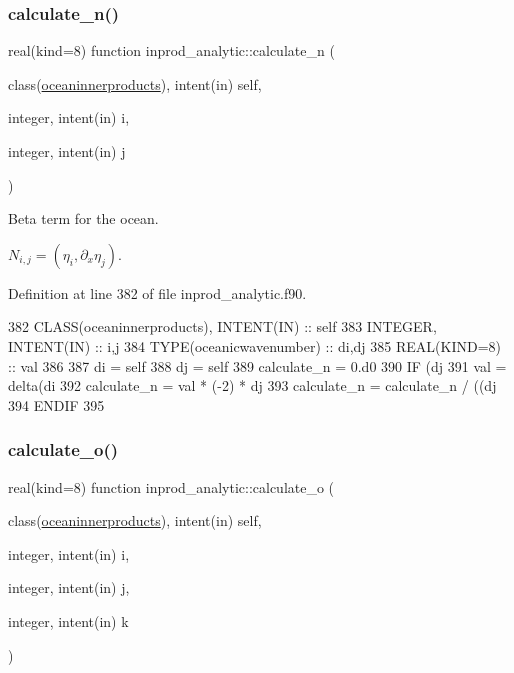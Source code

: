 \subsubsection{\texorpdfstring{calculate\+\_\+n()}{calculate\_n()}}
{\footnotesize\ttfamily real(kind=8) function inprod\+\_\+analytic\+::calculate\+\_\+n (\begin{DoxyParamCaption}\item[{class(\hyperlink{structinprod__analytic_1_1oceaninnerproducts}{oceaninnerproducts}), intent(in)}]{self,  }\item[{integer, intent(in)}]{i,  }\item[{integer, intent(in)}]{j }\end{DoxyParamCaption})\hspace{0.3cm}{\ttfamily [private]}}



Beta term for the ocean. 

$ N_{i,j} = (\eta_i, \partial_x \eta_j) $. 

Definition at line 382 of file inprod\+\_\+analytic.\+f90.


\begin{DoxyCode}
382     \textcolor{keywordtype}{CLASS}(oceaninnerproducts), \textcolor{keywordtype}{INTENT(IN)} :: self
383     \textcolor{keywordtype}{INTEGER}, \textcolor{keywordtype}{INTENT(IN)} :: i,j
384     \textcolor{keywordtype}{TYPE}(oceanicwavenumber) :: di,dj
385     \textcolor{keywordtype}{REAL(KIND=8)} :: val
386 
387     di = self%
388     dj = self%
389     calculate\_n = 0.d0
390     \textcolor{keywordflow}{IF} (dj%
391       val = delta(di%
392       calculate\_n = val * (-2) * dj%
393       calculate\_n = calculate\_n / ((dj%
394 \textcolor{keywordflow}{    ENDIF}
395         
\end{DoxyCode}
\mbox{\label{namespaceinprod__analytic_ad8d3f48abb40cd01056bbb15c4c52be6}} 
\subsubsection{\texorpdfstring{calculate\+\_\+o()}{calculate\_o()}}
{\footnotesize\ttfamily real(kind=8) function inprod\+\_\+analytic\+::calculate\+\_\+o (\begin{DoxyParamCaption}\item[{class(\hyperlink{structinprod__analytic_1_1oceaninnerproducts}{oceaninnerproducts}), intent(in)}]{self,  }\item[{integer, intent(in)}]{i,  }\item[{integer, intent(in)}]{j,  }\item[{integer, intent(in)}]{k }\end{DoxyParamCaption})\hspace{0.3cm}{\ttfamily [private]}}




